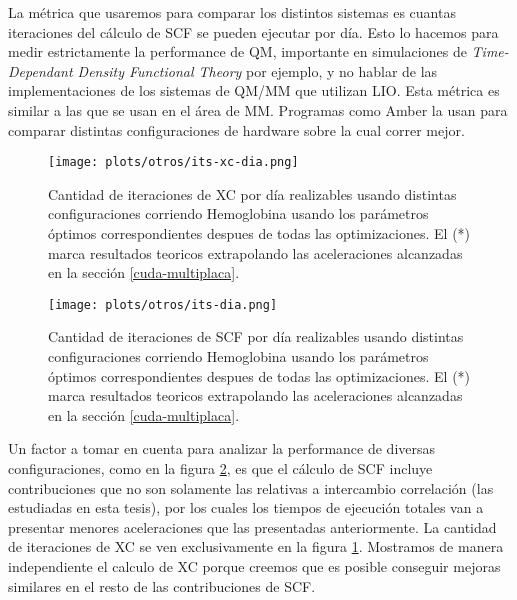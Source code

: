 La m\'etrica que usaremos para comparar los distintos sistemas es cuantas iteraciones del c\'alculo de
SCF se pueden ejecutar por d\'ia. Esto lo hacemos para medir estrictamente la performance
de QM, importante en simulaciones de \textit{Time-Dependant Density Functional Theory} por ejemplo, y no
hablar de las implementaciones de los sistemas de QM/MM que utilizan LIO.
Esta m\'etrica es similar a las que se usan en el \'area de MM. Programas como Amber\cite{Amber} la usan para comparar
distintas configuraciones de hardware sobre la cual correr mejor.

\begin{figure}[htbp]
    \centering
    \texttt{[image: plots/otros/its-xc-dia.png]}
    \caption{Cantidad de iteraciones de XC por d\'ia realizables usando distintas configuraciones corriendo Hemoglobina usando los
              par\'ametros \'optimos correspondientes despues de todas las optimizaciones. El (*) marca resultados teoricos extrapolando
              las aceleraciones alcanzadas en la secci\'on \ref{cuda-multiplaca}.}
    \label{fig:its-xc-dia}
\end{figure}


\begin{figure}[htbp]
    \centering
    \texttt{[image: plots/otros/its-dia.png]}
    \caption{Cantidad de iteraciones de SCF por d\'ia realizables usando distintas configuraciones corriendo Hemoglobina usando los
              par\'ametros \'optimos correspondientes despues de todas las optimizaciones. El (*) marca resultados teoricos extrapolando
              las aceleraciones alcanzadas en la secci\'on \ref{cuda-multiplaca}.}
    \label{fig:its-dia}
\end{figure}

Un factor a tomar en cuenta para analizar la performance de diversas configuraciones, como en la figura \ref{fig:its-dia},
es que el c\'alculo de SCF incluye contribuciones que no son solamente las relativas a intercambio correlaci\'on
(las estudiadas en esta tesis), por los cuales los tiempos de ejecuci\'on totales van
a presentar menores aceleraciones que las presentadas anteriormente. La cantidad de iteraciones de XC se ven
exclusivamente en la figura \ref{fig:its-xc-dia}. Mostramos de manera independiente el calculo de XC porque
creemos que es posible conseguir mejoras similares en el resto de las contribuciones de SCF.


